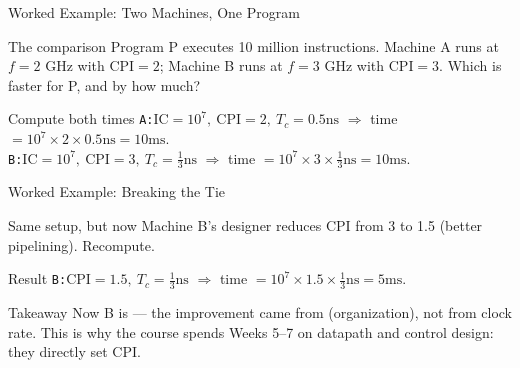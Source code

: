 \documentclass[aspectratio=169]{beamer}
\begin{document}
\begin{frame}{Worked Example: Two Machines, One Program}
  \begin{block}{The comparison}
    Program P executes 10 million instructions. Machine A runs at $f = 2$ GHz
    with $\text{CPI} = 2$; Machine B runs at $f = 3$ GHz with $\text{CPI} = 3$.
    Which is faster for P, and by how much?
  \end{block}
  \begin{exampleblock}{Compute both times}
    \texttt{A:}\quad $\text{IC}=10^7,\ \text{CPI}=2,\ T_c = 0.5\text{ns}$
    $\Rightarrow$ time $= 10^7 \times 2 \times 0.5\text{ns} = 10\text{ms}$.\\
    \texttt{B:}\quad $\text{IC}=10^7,\ \text{CPI}=3,\ T_c = \tfrac{1}{3}\text{ns}$
    $\Rightarrow$ time $= 10^7 \times 3 \times \tfrac{1}{3}\text{ns} = 10\text{ms}$.
  \end{exampleblock}
  \vspace{0.2cm}
\end{frame}

\begin{frame}{Worked Example: Breaking the Tie}
  \begin{block}{Same setup, but now}
    Machine B's designer reduces CPI from 3 to 1.5 (better pipelining).
    Recompute.
  \end{block}
  \begin{exampleblock}{Result}
    \texttt{B:}\quad $\text{CPI}=1.5,\ T_c=\tfrac{1}{3}\text{ns}$
    $\Rightarrow$ time $= 10^7 \times 1.5 \times \tfrac{1}{3}\text{ns} = 5\text{ms}$.
  \end{exampleblock}
  \vspace{0.2cm}
  \begin{alertblock}{Takeaway}
    Now B is  --- the improvement came from 
    (organization), not from clock rate. This is why the course spends Weeks
    5--7 on datapath and control design: they directly set CPI.
  \end{alertblock}
\end{frame}
\end{document}

